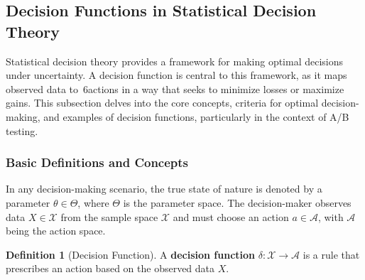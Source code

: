 \documentclass[magisterska, english]{pwr_wmat_praca_dyplomowa}
\theoremstyle{plain}
\numberwithin{theorem}{chapter}
\theoremstyle{definition}
\numberwithin{theorem}{chapter}
\newtheorem{definition}[theorem]{Definition}
\begin{document}
%
%


\subsection{Decision Functions in Statistical Decision Theory}

Statistical decision theory provides a framework for making optimal decisions under uncertainty. A decision function is central to this framework, as it maps observed data to~6actions in a way that seeks to minimize losses or maximize gains. This subsection delves into the core concepts, criteria for optimal decision-making, and examples of decision functions, particularly in the context of A/B testing.

\subsubsection{Basic Definitions and Concepts}

In any decision-making scenario, the true state of nature is denoted by a parameter \( \theta \in \Theta \), where \( \Theta \) is the parameter space. The decision-maker observes data \( X \in \mathcal{X} \) from the sample space \( \mathcal{X} \) and must choose an action \( a \in \mathcal{A} \), with \( \mathcal{A} \) being the action space.

\begin{definition}[Decision Function]
	A \textbf{decision function} \( \delta: \mathcal{X} \rightarrow \mathcal{A} \) is a rule that prescribes an action based on the observed data \( X \).
\end{definition}
\end{document}
